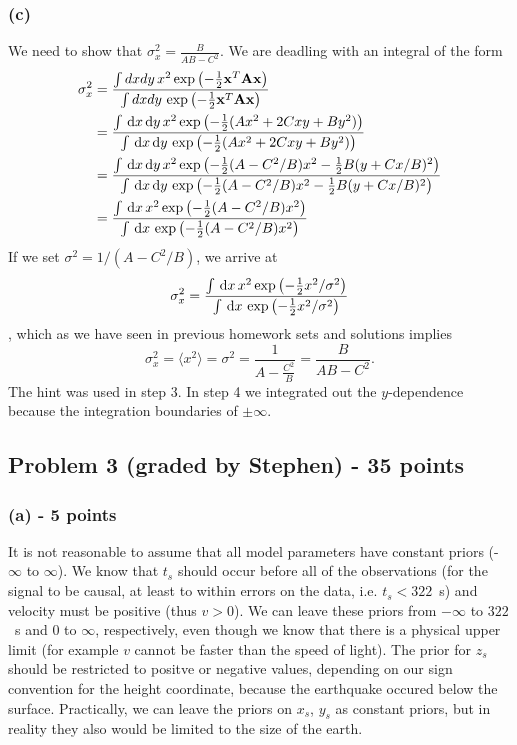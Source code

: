 \documentclass[11pt]{article}
\begin{document}
\subsubsection*{(c)}
We need to show that $\sigma_x^2 = \frac{B}{AB-C^2}$. We are deadling with an integral of the form
\begin{subequations}
\begin{align}
\sigma_x^2 &= \frac{\int dx dy \, x^2 \exp\left( -\frac{1}{2}\mathbf{x}^T \mathbf{A} \mathbf{x}  \right)}{\int dx dy \, \exp\left( -\frac{1}{2}\mathbf{x}^T \mathbf{A} \mathbf{x}  \right)}\\
&= \frac{\int \, \text{d}x \, \text{d}y \, x^2 \exp\left( -\frac{1}{2}(Ax^2 + 2Cxy +By^2)  \right)}{\int \, \text{d}x \, \text{d}y \, \exp\left( -\frac{1}{2}(Ax^2 + 2Cxy +By^2)  \right)}\\
&= \frac{\int \, \text{d}x \, \text{d}y \, x^2 \exp\left( -\frac{1}{2}(A-C^2/B)x^2 -\frac{1}{2}B(y + Cx/B)^2  \right)}{\int \, \text{d}x \, \text{d}y \, \exp\left( -\frac{1}{2}(A-C^2/B)x^2 -\frac{1}{2}B(y + Cx/B)^2  \right)}\\
&= \frac{\int \, \text{d}x \, x^2 \exp\left( -\frac{1}{2}(A-C^2/B)x^2 \right)}{\int \, \text{d}x \, \exp\left( -\frac{1}{2}(A-C^2/B)x^2 \right)}
\end{align}
\end{subequations}
If we set $\sigma^2 = 1/(A-C^2/B)$, we arrive at
\begin{equation}
\sigma_x^2 = \frac{\int \, \text{d}x \, x^2 \exp\left( -\frac{1}{2}x^2/\sigma^2 \right)}{\int \, \text{d}x \, \exp\left( -\frac{1}{2}x^2/\sigma^2 \right)}
\end{equation}, 
which as we have seen in previous homework sets and solutions implies
\begin{equation}
\sigma_x^2 = \langle x^2\rangle = \sigma^2 = \frac{1}{A-\frac{C^2}{B}} = \frac{B}{AB-C^2}.
\end{equation}
The hint was used in step 3. In step 4 we integrated out the $y$-dependence because the integration boundaries of $\pm \infty$.

\subsection*{Problem 3 (graded by Stephen) - 35 points}


\subsubsection*{(a) - 5 points}
It is not reasonable to assume that all model parameters have constant priors (-$\infty$ to $\infty$).  We know that $t_s$ should occur before all of the observations (for the signal to be causal, at least to within errors on the data, i.e. $t_s<322$~s) and velocity must be positive (thus $v>0$).  We can leave these priors from $-\infty$ to $322$~s and 0 to $\infty$, respectively, even though we know that there is a physical upper limit (for example $v$ cannot be faster than the speed of light). The prior for $z_s$ should be restricted to positve or negative values, depending on our sign convention for the height coordinate, because the earthquake occured below the surface. Practically, we can leave the priors on $x_s$, $y_s$ as constant priors, but in reality they also would be limited to the size of the earth.
\end{document}
